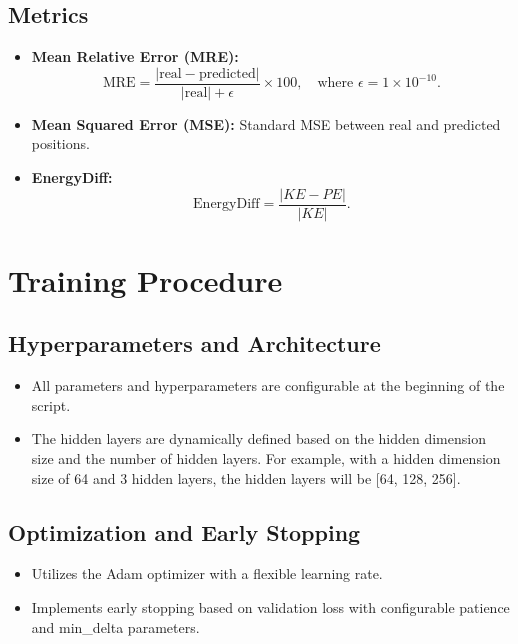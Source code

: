 \documentclass[a4paper,10pt]{article}
\begin{document}
\subsection{Metrics}
\begin{itemize}[leftmargin=*]
    \item \textbf{Mean Relative Error (MRE):}
    \begin{equation}
    \text{MRE} = \frac{\lvert \text{real} - \text{predicted} \rvert}{\lvert \text{real} \rvert + \epsilon} \times 100, \quad \text{where } \epsilon = 1 \times 10^{-10}.
    \end{equation}
    \item \textbf{Mean Squared Error (MSE):} Standard MSE between real and predicted positions.
    \item \textbf{EnergyDiff:}
    \begin{equation}
    \text{EnergyDiff} = \frac{\lvert KE - PE \rvert}{\lvert KE \rvert}.
    \end{equation}
\end{itemize}

\section{Training Procedure}

\subsection{Hyperparameters and Architecture}
\begin{itemize}[leftmargin=*]
    \item All parameters and hyperparameters are configurable at the beginning of the script.
    \item The hidden layers are dynamically defined based on the hidden dimension size and the number of hidden layers. For example, with a hidden dimension size of 64 and 3 hidden layers, the hidden layers will be [64, 128, 256].
\end{itemize}

\subsection{Optimization and Early Stopping}
\begin{itemize}[leftmargin=*]
    \item Utilizes the Adam optimizer with a flexible learning rate.
    \item Implements early stopping based on validation loss with configurable patience and min\_delta parameters.
\end{itemize}
\end{document}
